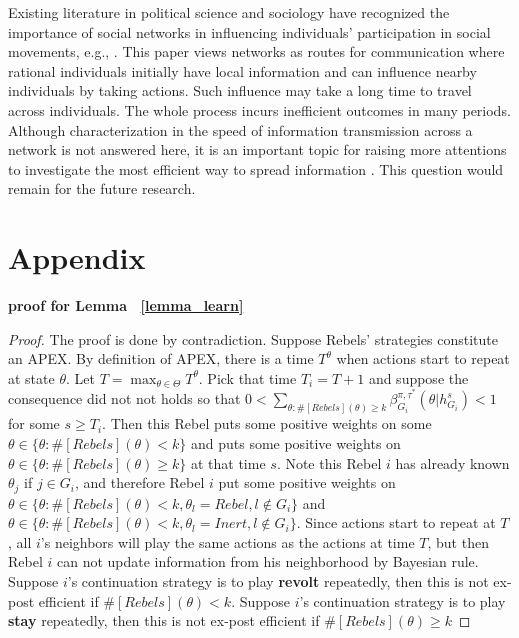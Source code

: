 \documentclass[12pt,letterpaper]{article}
\theoremstyle{definition}
\theoremstyle{remark}
\theoremstyle{claim}
\begin{document}
Existing literature in political science and sociology have recognized the importance of social networks in influencing individuals' participation in social movements, e.g., \citep{Passy2003}\citep{McAdam2003}\citep{Siegel2009}. This paper views networks as routes for communication where rational individuals initially have local information and can influence nearby individuals by taking actions. Such influence may take a long time to travel across individuals. The whole process incurs inefficient outcomes in many periods. Although characterization in the speed of information transmission across a network is not answered here, it is an important topic for raising more attentions to investigate the most efficient way to spread information . This question would remain for the future research.






\appendix
\section{Appendix}

\noindent\textbf{proof for Lemma ~\ref{lemma_learn}}

\begin{proof}
The proof is done by contradiction. Suppose Rebels' strategies constitute an APEX. By definition of APEX, there is a time $T^{\theta}$ when actions start to repeat at state $\theta$. Let $T=\max_{\theta\in \Theta}{T^{\theta}}$. Pick that time $T_i=T+1$ and suppose the consequence did not not holds so that $0<\sum_{\theta:\#[Rebels](\theta)\geq k}\beta^{\pi,\tau^*}_{G_i}(\theta|h^{s}_{G_i})<1$ for some $s\geq T_i$. Then this Rebel puts some positive weights on some $\theta\in \{\theta:\#[Rebels](\theta)< k\}$ and puts some positive weights on $\theta\in \{\theta:\#[Rebels](\theta)\geq k\}$ at that time $s$. Note this Rebel $i$ has already known $\theta_j$ if $j\in G_i$, and therefore Rebel $i$ put some positive weights on $\theta\in \{\theta:\#[Rebels](\theta)< k, \theta_l=Rebel, l\notin G_i\}$ and $\theta\in \{\theta:\#[Rebels](\theta)< k, \theta_l=Inert, l\notin G_i\}$. Since actions start to repeat at $T$, all $i$'s neighbors will play the same actions as the actions at time $T$, but then Rebel $i$ can not update information from his neighborhood by Bayesian rule. Suppose $i$'s continuation strategy is to play \textbf{revolt} repeatedly, then this is not ex-post efficient if $\#[Rebels](\theta)< k$. Suppose $i$'s continuation strategy is to play \textbf{stay} repeatedly, then this is not ex-post efficient if $\#[Rebels](\theta)\geq k$
\end{proof}
\end{document}
